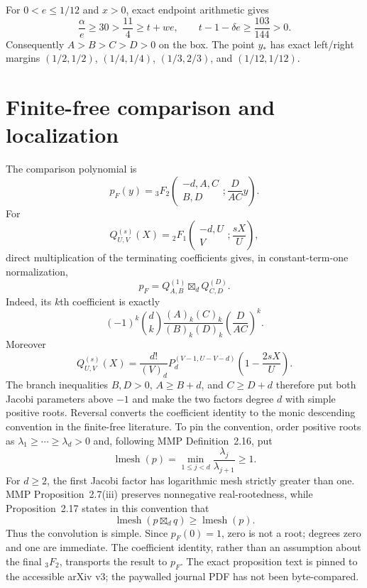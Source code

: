\documentclass[11pt]{article}
\theoremstyle{definition}
\theoremstyle{remark}
\begin{document}
For $0<e\le1/12$ and $x>0$, exact endpoint arithmetic gives
\[
 \frac{\alpha}{e}\ge30>\frac{11}{4}\ge t+we,\qquad
 t-1-\delta e\ge\frac{103}{144}>0.
\]
Consequently $A>B>C>D>0$ on the box.  The point $y_*$ has exact left/right
margins $(1/2,1/2)$, $(1/4,1/4)$, $(1/3,2/3)$, and $(1/12,1/12)$.

\section{Finite-free comparison and localization}\label{sec:finitefree}

The comparison polynomial is
\[
 p_F(y)={}_3F_2\!\left(
 \begin{matrix}-d,A,C\\B,D\end{matrix};\frac{D}{AC}y\right).
\]
For
\[
 Q_{U,V}^{(s)}(X)={}_2F_1\!\left(
 \begin{matrix}-d,U\\V\end{matrix};\frac{sX}{U}\right),
\]
direct multiplication of the terminating coefficients gives, in
constant-term-one normalization,
\[
 p_F=Q_{A,B}^{(1)}\boxtimes_d Q_{C,D}^{(D)}.
\]
Indeed, its $k$th coefficient is exactly
\[
 (-1)^k\binom dk
 \frac{(A)_k(C)_k}{(B)_k(D)_k}
 \left(\frac{D}{AC}\right)^k.
\]
Moreover
\[
 Q_{U,V}^{(s)}(X)=\frac{d!}{(V)_d}
 P_d^{(V-1,U-V-d)}\!\left(1-\frac{2sX}{U}\right).
\]
The branch inequalities $B,D>0$, $A\ge B+d$, and $C\ge D+d$ therefore put
both Jacobi parameters above $-1$ and make the two factors degree $d$ with
simple positive roots.  Reversal converts the coefficient identity to
the monic descending convention in the finite-free literature.  To pin the
convention, order positive roots as
$\lambda_1\ge\cdots\ge\lambda_d>0$ and, following MMP Definition~2.16, put
\[
 \operatorname{lmesh}(p)=
 \min_{1\le j<d}\frac{\lambda_j}{\lambda_{j+1}}\ge1.
\]
For $d\ge2$, the first Jacobi factor has logarithmic mesh strictly greater
than one.  MMP Proposition~2.7(iii) preserves nonnegative
real-rootedness, while Proposition~2.17 states in this convention that
\[
 \operatorname{lmesh}(p\boxtimes_dq)
 \ge \operatorname{lmesh}(p).
\]
Thus the convolution is simple.  Since $p_F(0)=1$, zero is not a root; degrees
zero and one are immediate.  The coefficient identity, rather than an
assumption about the final ${}_3F_2$, transports the result to $p_F$.  The
exact proposition text is pinned to the accessible arXiv v3; the paywalled
journal PDF has not been byte-compared.
\end{document}
